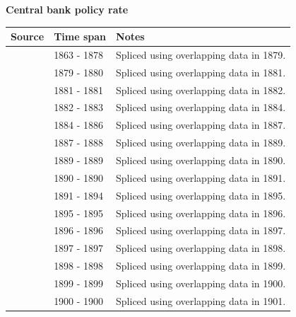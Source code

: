 \documentclass[12pt,a4paper,landscape]{article}
\begin{document}
\begin{adjustbox}{max totalsize={\paperwidth}{\paperheight},center}
\begin{minipage}[t][\textheight][t]{\textwidth}
\vspace*{0.5cm}
{}
\begin{center}
{\Large\bfseries Central bank policy rate}
\end{center}
\vspace{0.5cm}
\begin{table}[H]
\centering
\small
\begin{tabular}{|l|l|l|}
\hline
\textbf{Source} & \textbf{Time span} & \textbf{Notes} \\
\hline
\rowcolor{white}\cite{CS2_ITA}& 1863 - 1878 &Spliced using overlapping data in 1879. \\
\rowcolor{lightgray}\cite{FZ}& 1879 - 1880 &Spliced using overlapping data in 1881. \\
\rowcolor{white}\cite{CS2_ITA}& 1881 - 1881 &Spliced using overlapping data in 1882. \\
\rowcolor{lightgray}\cite{FZ}& 1882 - 1883 &Spliced using overlapping data in 1884. \\
\rowcolor{white}\cite{CS2_ITA}& 1884 - 1886 &Spliced using overlapping data in 1887. \\
\rowcolor{lightgray}\cite{FZ}& 1887 - 1888 &Spliced using overlapping data in 1889. \\
\rowcolor{white}\cite{CS2_ITA}& 1889 - 1889 &Spliced using overlapping data in 1890. \\
\rowcolor{lightgray}\cite{FZ}& 1890 - 1890 &Spliced using overlapping data in 1891. \\
\rowcolor{white}\cite{CS2_ITA}& 1891 - 1894 &Spliced using overlapping data in 1895. \\
\rowcolor{lightgray}\cite{FZ}& 1895 - 1895 &Spliced using overlapping data in 1896. \\
\rowcolor{white}\cite{CS2_ITA}& 1896 - 1896 &Spliced using overlapping data in 1897. \\
\rowcolor{lightgray}\cite{FZ}& 1897 - 1897 &Spliced using overlapping data in 1898. \\
\rowcolor{white}\cite{CS2_ITA}& 1898 - 1898 &Spliced using overlapping data in 1899. \\
\rowcolor{lightgray}\cite{FZ}& 1899 - 1899 &Spliced using overlapping data in 1900. \\
\rowcolor{white}\cite{CS2_ITA}& 1900 - 1900 &Spliced using overlapping data in 1901. \\

\end{tabular}
\end{table}
\end{minipage}
\end{adjustbox}
\end{document}

